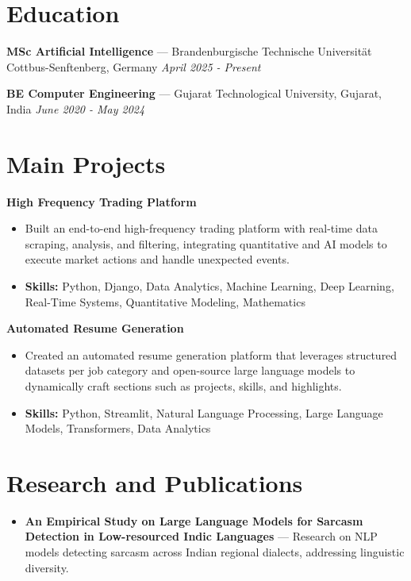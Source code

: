 \documentclass[a4paper,10pt]{article}
\begin{document}
\section*{Education}
\textbf{MSc Artificial Intelligence} — Brandenburgische Technische Universität Cottbus-Senftenberg, Germany \hfill \textit{April 2025 - Present}\par
\vspace{1.5pt}
\textbf{BE Computer Engineering} — Gujarat Technological University, Gujarat, India \hfill \textit{June 2020 - May 2024}\par

\section*{Main Projects}
\textbf{High Frequency Trading Platform}\par
\vspace{1pt}
\begin{itemize}
  \item Built an end-to-end high-frequency trading platform with real-time data scraping, analysis, and filtering, integrating quantitative and AI models to execute market actions and handle unexpected events.
  \item \textbf{Skills:} Python, Django, Data Analytics, Machine Learning, Deep Learning, Real-Time Systems, Quantitative Modeling, Mathematics
\end{itemize}
\vspace{3pt}
\textbf{Automated Resume Generation}\par
\vspace{1pt}
\begin{itemize}
  \item Created an automated resume generation platform that leverages structured datasets per job category and open-source large language models to dynamically craft sections such as projects, skills, and highlights.
  \item \textbf{Skills:} Python, Streamlit, Natural Language Processing, Large Language Models, Transformers, Data Analytics
\end{itemize}

\section*{Research and Publications}
\begin{itemize}
\item \textbf{An Empirical Study on Large Language Models for Sarcasm Detection in Low-resourced Indic Languages} — Research on NLP models detecting sarcasm across Indian regional dialects, addressing linguistic diversity.
\end{itemize}
\end{document}
